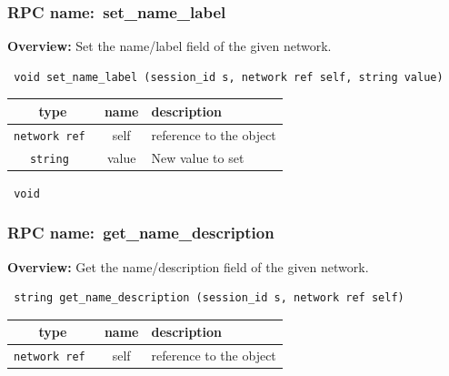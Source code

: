 \subsubsection{RPC name:~set\_name\_label}

{\bf Overview:} 
Set the name/label field of the given network.

\begin{verbatim} void set_name_label (session_id s, network ref self, string value)\end{verbatim}



 
\vspace{0.3cm}
\begin{tabular}{|c|c|p{7cm}|}
 \hline
{\bf type} & {\bf name} & {\bf description} \\ \hline
{\tt network ref } & self & reference to the object \\ \hline 

{\tt string } & value & New value to set \\ \hline 

\end{tabular}

\vspace{0.3cm}

{\tt 
void
}



\vspace{0.3cm}
\vspace{0.3cm}
\vspace{0.3cm}
\subsubsection{RPC name:~get\_name\_description}

{\bf Overview:} 
Get the name/description field of the given network.

\begin{verbatim} string get_name_description (session_id s, network ref self)\end{verbatim}



 
\vspace{0.3cm}
\begin{tabular}{|c|c|p{7cm}|}
 \hline
{\bf type} & {\bf name} & {\bf description} \\ \hline
{\tt network ref } & self & reference to the object \\ \hline 

\end{tabular}

